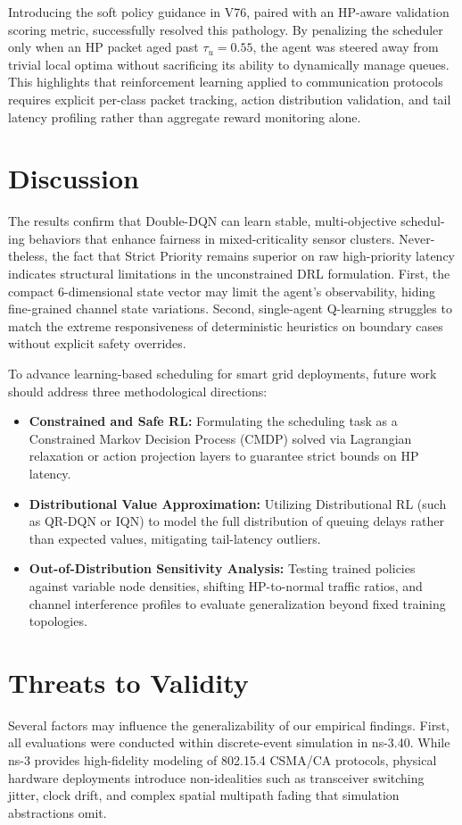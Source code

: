 \documentclass[runningheads,a4paper]{llncs}
\begin{document}
Introducing the soft policy guidance in V76, paired with an HP-aware validation
scoring metric, successfully resolved this pathology. By penalizing the scheduler
only when an HP packet aged past $\tau_u = 0.55$, the agent was steered away
from trivial local optima without sacrificing its ability to dynamically manage
queues. This highlights that reinforcement learning applied to communication
protocols requires explicit per-class packet tracking, action distribution validation,
and tail latency profiling rather than aggregate reward monitoring alone.

\section{Discussion}
The results confirm that Double-DQN can learn stable, multi-objective schedul-
ing behaviors that enhance fairness in mixed-criticality sensor clusters. Never-
theless, the fact that Strict Priority remains superior on raw high-priority latency
indicates structural limitations in the unconstrained DRL formulation. First, the
compact 6-dimensional state vector may limit the agent's observability, hiding
fine-grained channel state variations. Second, single-agent Q-learning struggles
to match the extreme responsiveness of deterministic heuristics on boundary cases
without explicit safety overrides.

To advance learning-based scheduling for smart grid deployments, future work
should address three methodological directions:
\begin{itemize}
    \item \textbf{Constrained and Safe RL:} Formulating the scheduling task as a Constrained Markov Decision Process (CMDP) solved via Lagrangian relaxation or action projection layers to guarantee strict bounds on HP latency.
    \item \textbf{Distributional Value Approximation:} Utilizing Distributional RL (such as QR-DQN or IQN) to model the full distribution of queuing delays rather than expected values, mitigating tail-latency outliers.
    \item \textbf{Out-of-Distribution Sensitivity Analysis:} Testing trained policies against variable node densities, shifting HP-to-normal traffic ratios, and channel interference profiles to evaluate generalization beyond fixed training topologies.
\end{itemize}

\section{Threats to Validity}
Several factors may influence the generalizability of our empirical findings. First,
all evaluations were conducted within discrete-event simulation in ns-3.40. While
ns-3 provides high-fidelity modeling of 802.15.4 CSMA/CA protocols, physical
hardware deployments introduce non-idealities such as transceiver switching jitter,
clock drift, and complex spatial multipath fading that simulation abstractions omit.
\end{document}

